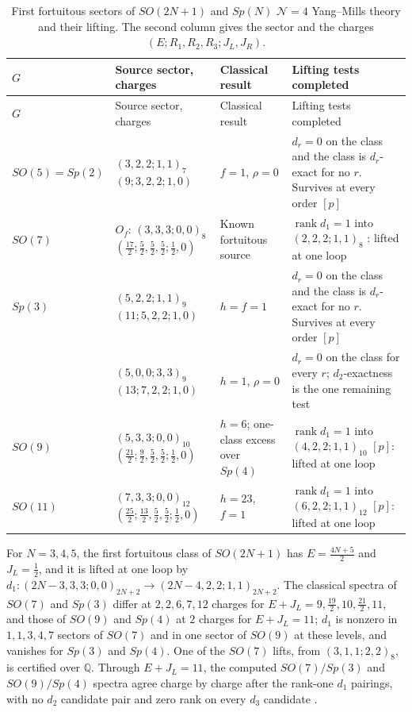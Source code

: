 \documentclass[11pt]{article}
\numberwithin{equation}{section}
\numberwithin{figure}{section}
\numberwithin{table}{section}
\begin{document}
{\footnotesize\renewcommand{\arraystretch}{1.3}\setlength{\tabcolsep}{3.5pt}
\begin{xltabular}{\linewidth}{|l|>{\raggedright\arraybackslash}p{3.55cm}|>{\raggedright\arraybackslash}X|>{\raggedright\arraybackslash}X|}
\caption{First fortuitous sectors of $SO(2N+1)$ and $Sp(N)$ $\mathcal N=4$ Yang--Mills theory and their lifting. The second column gives the sector and the charges $(E;R_1,R_2,R_3;J_L,J_R)$.}\label{local-ch9-sosp-classes}\\
\hline
$G$ & Source sector, charges & Classical result & Lifting tests completed\\
\hline\endfirsthead
\hline
$G$ & Source sector, charges & Classical result & Lifting tests completed\\
\hline\endhead
$SO(5)=Sp(2)$ & $(3,2,2;1,1)_7$\newline $(9;3,2,2;1,0)$ & $f=1$, $\rho=0$ & $d_r=0$ on the class and the class is $d_r$-exact for no $r$. Survives at every order $[p]$\\
\hline
$SO(7)$ & $O_f$: $(3,3,3;0,0)_8$\newline $(\tfrac{17}2;\tfrac52,\tfrac52,\tfrac52;\tfrac12,0)$ & Known fortuitous source \cite{GLRT} & $\operatorname{rank}d_1=1$ into $(2,2,2;1,1)_8$ \cite{KonishiBH}: lifted at one loop\\
\hline
$Sp(3)$ & $(5,2,2;1,1)_9$\newline $(11;5,2,2;1,0)$ & $h=f=1$ & $d_r=0$ on the class and the class is $d_r$-exact for no $r$. Survives at every order $[p]$\\
 & $(5,0,0;3,3)_9$\newline $(13;7,2,2;1,0)$ & $h=1$, $\rho=0$ & $d_r=0$ on the class for every $r$; $d_2$-exactness is the one remaining test\\
\hline
$SO(9)$ & $(5,3,3;0,0)_{10}$\newline $(\tfrac{21}2;\tfrac92,\tfrac52,\tfrac52;\tfrac12,0)$ & $h=6$; one-class excess over $Sp(4)$ & $\operatorname{rank}d_1=1$ into $(4,2,2;1,1)_{10}$ $[p]$: lifted at one loop\\
\hline
$SO(11)$ & $(7,3,3;0,0)_{12}$\newline $(\tfrac{25}2;\tfrac{13}2,\tfrac52,\tfrac52;\tfrac12,0)$ & $h=23$, $f=1$ & $\operatorname{rank}d_1=1$ into $(6,2,2;1,1)_{12}$ $[p]$: lifted at one loop\\
\hline
\end{xltabular}}

For $N=3,4,5$, the first fortuitous class of $SO(2N+1)$ has $E=\tfrac{4N+5}2$ and $J_L=\tfrac12$, and it is lifted at one loop by $d_1:(2N-3,3,3;0,0)_{2N+2}\to(2N-4,2,2;1,1)_{2N+2}$. The classical spectra of $SO(7)$ and $Sp(3)$ differ at $2,2,6,7,12$ charges for $E+J_L=9,\tfrac{19}2,10,\tfrac{21}2,11$, and those of $SO(9)$ and $Sp(4)$ at $2$ charges for $E+J_L=11$; $d_1$ is nonzero in $1,1,3,4,7$ sectors of $SO(7)$ and in one sector of $SO(9)$ at these levels, and vanishes for $Sp(3)$ and $Sp(4)$. One of the $SO(7)$ lifts, from $(3,1,1;2,2)_8$, is certified over $\mathbb Q$. Through $E+J_L=11$, the computed $SO(7)/Sp(3)$ and $SO(9)/Sp(4)$ spectra agree charge by charge after the rank-one $d_1$ pairings, with no $d_2$ candidate pair and zero rank on every $d_3$ candidate \cite[supplement, Section S3.3]{Repo}.
\end{document}
